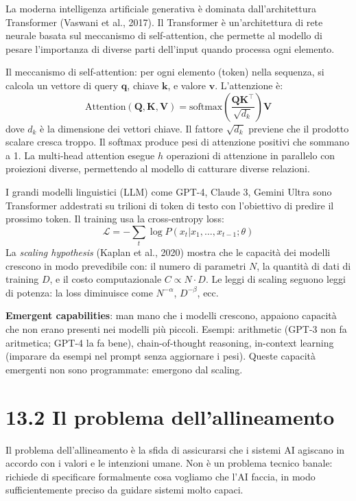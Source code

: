 \documentclass[11.5pt,a4paper,openany]{book}
\theoremstyle{remark}
\begin{document}
La moderna intelligenza artificiale generativa è dominata dall'architettura Transformer (Vaswani et al., 2017). Il Transformer è un'architettura di rete neurale basata sul meccanismo di self-attention, che permette al modello di pesare l'importanza di diverse parti dell'input quando processa ogni elemento.

Il meccanismo di self-attention: per ogni elemento (token) nella sequenza, si calcola un vettore di query $\mathbf{q}$, chiave $\mathbf{k}$, e valore $\mathbf{v}$. L'attenzione è:
\[
\text{Attention}(\mathbf{Q}, \mathbf{K}, \mathbf{V}) = \text{softmax}\left(\frac{\mathbf{Q}\mathbf{K}^\top}{\sqrt{d_k}}\right)\mathbf{V}
\]
dove $d_k$ è la dimensione dei vettori chiave. Il fattore $\sqrt{d_k}$ previene che il prodotto scalare cresca troppo. Il softmax produce pesi di attenzione positivi che sommano a 1. La multi-head attention esegue $h$ operazioni di attenzione in parallelo con proiezioni diverse, permettendo al modello di catturare diverse relazioni.

I grandi modelli linguistici (LLM) come GPT-4, Claude 3, Gemini Ultra sono Transformer addestrati su trilioni di token di testo con l'obiettivo di predire il prossimo token. Il training usa la cross-entropy loss:
\[
\mathcal{L} = -\sum_{t} \log P(x_t | x_1, \ldots, x_{t-1}; \theta)
\]
La \textit{scaling hypothesis} (Kaplan et al., 2020) mostra che le capacità dei modelli crescono in modo prevedibile con: il numero di parametri $N$, la quantità di dati di training $D$, e il costo computazionale $C \propto N \cdot D$. Le leggi di scaling seguono leggi di potenza: la loss diminuisce come $N^{-\alpha}$, $D^{-\beta}$, ecc.

\textbf{Emergent capabilities}: man mano che i modelli crescono, appaiono capacità che non erano presenti nei modelli più piccoli. Esempi: arithmetic (GPT-3 non fa aritmetica; GPT-4 la fa bene), chain-of-thought reasoning, in-context learning (imparare da esempi nel prompt senza aggiornare i pesi). Queste capacità emergenti non sono programmate: emergono dal scaling.

\section{13.2 Il problema dell'allineamento}

Il problema dell'allineamento è la sfida di assicurarsi che i sistemi AI agiscano in accordo con i valori e le intenzioni umane. Non è un problema tecnico banale: richiede di specificare formalmente cosa vogliamo che l'AI faccia, in modo sufficientemente preciso da guidare sistemi molto capaci.
\end{document}
